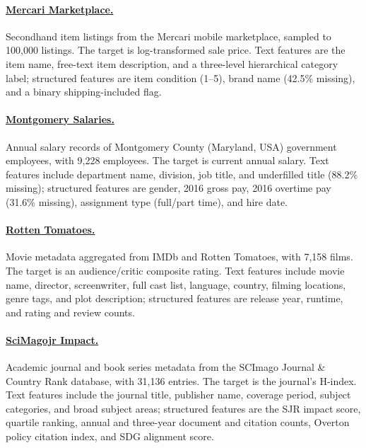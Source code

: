 \documentclass{llmxive}
\begin{document}
\paragraph{\href{https://www.openml.org/search?type=data&id=46660}{Mercari Marketplace.}}
Secondhand item listings from the Mercari mobile marketplace, sampled to 100,000 listings.
The target is log-transformed sale price.
Text features are the item name, free-text item description, and a three-level hierarchical category label; structured features are item condition (1--5), brand name (42.5\% missing), and a binary shipping-included flag.

\paragraph{\href{https://www.openml.org/search?type=data&id=42125}{Montgomery Salaries.}}
Annual salary records of Montgomery County (Maryland, USA) government employees, with 9,228 employees.
The target is current annual salary.
Text features include department name, division, job title, and underfilled title (88.2\% missing); structured features are gender, 2016 gross pay, 2016 overtime pay (31.6\% missing), assignment type (full/part time), and hire date.

\paragraph{\href{http://pages.cs.wisc.edu/~anhai/data/784_data/movies1/}{Rotten Tomatoes.}}
Movie metadata aggregated from IMDb and Rotten Tomatoes, with 7,158 films.
The target is an audience/critic composite rating.
Text features include movie name, director, screenwriter, full cast list, language, country, filming locations, genre tags, and plot description; structured features are release year, runtime, and rating and review counts.

\paragraph{\href{https://www.scimagojr.com/journalrank.php}{SciMagojr Impact.}}
Academic journal and book series metadata from the SCImago Journal \& Country Rank database, with 31,136 entries.
The target is the journal's H-index.
Text features include the journal title, publisher name, coverage period, subject categories, and broad subject areas; structured features are the SJR impact score, quartile ranking, annual and three-year document and citation counts, Overton policy citation index, and SDG alignment score.
\end{document}
